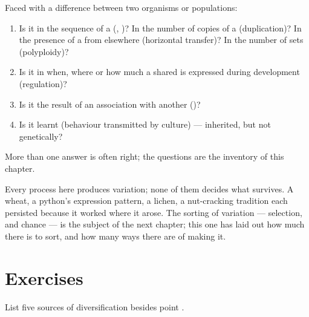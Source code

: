 \begin{method}\label{met:g12:diversification-of-life:name}
Faced with a difference between two organisms or populations:
\begin{enumerate}
  \item Is it in the sequence of a  (, )? In the
        number of copies of a  (duplication)? In the presence of a
         from elsewhere (horizontal transfer)? In the number of
         sets (polyploidy)?
  \item Is it in when, where or how much a shared  is expressed
        during development (regulation)?
  \item Is it the result of an association with another 
        ()?
  \item Is it learnt (behaviour transmitted by culture) --- inherited,
        but not genetically?
\end{enumerate}
More than one answer is often right; the questions are the inventory
of this chapter.
\end{method}

\begin{remark}\label{rem:g12:diversification-of-life:selection}
Every process here produces variation; none of them decides what
survives. A  wheat, a python's expression pattern, a lichen,
a nut-cracking tradition each persisted because it worked where it
arose. The sorting of variation --- selection, and chance --- is the
subject of the next chapter; this one has laid out how much there is
to sort, and how many ways there are of making it.
\end{remark}

\section{Exercises}

\begin{exercise}[$\star$]\label{exo:g12:diversification-of-life:1}
List five sources of diversification besides point .
\end{exercise}

